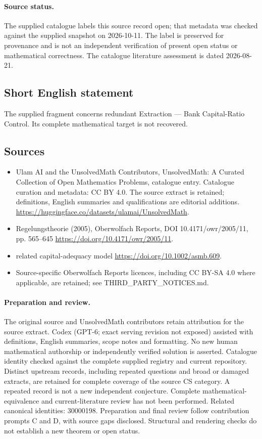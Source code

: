 \documentclass[11pt]{article}
\begin{document}
\paragraph{Source status.}
The supplied catalogue labels this source record open; that metadata was checked against the supplied snapshot on 2026-10-11. The label is preserved for provenance and is not an independent verification of present open status or mathematical correctness. The catalogue literature assessment is dated 2026-08-21.
\subsection{Short English statement}
The supplied fragment concerns redundant Extraction — Bank Capital-Ratio Control. Its complete mathematical target is not recovered.
\subsection{Sources}
\begin{itemize}
\item[\hypertarget{source:statement:1}{S1}] Ulam AI and the UnsolvedMath Contributors, UnsolvedMath: A Curated Collection of Open Mathematics Problems, catalogue entry. Catalogue curation and metadata: CC BY 4.0. The source extract is retained; definitions, English summaries and qualifications are editorial additions.
\url{https://huggingface.co/datasets/ulamai/UnsolvedMath}.
\item[\hypertarget{source:statement:2}{S2}] Regelungstheorie (2005), Oberwolfach Reports, DOI 10.4171/owr/2005/11, pp. 565--645
\url{https://doi.org/10.4171/owr/2005/11}.
\item[\hypertarget{source:statement:3}{S3}] related capital-adequacy model
\url{https://doi.org/10.1002/asmb.609}.
\item Source-specific Oberwolfach Reports licences, including CC BY-SA 4.0 where applicable, are retained; see THIRD\_PARTY\_NOTICES.md.
\end{itemize}
\paragraph{Preparation and review.}
The original source and UnsolvedMath contributors retain attribution for the source extract. Codex (GPT-6; exact serving revision not exposed) assisted with definitions, English summaries, scope notes and formatting. No new human mathematical authorship or independently verified solution is asserted. Catalogue identity checked against the complete supplied registry and current repository. Distinct upstream records, including repeated questions and broad or damaged extracts, are retained for complete coverage of the source CS category. A repeated record is not a new independent conjecture. Complete mathematical-equivalence and current-literature review has not been performed. Related canonical identities: 30000198. Preparation and final review follow contribution prompts C and D, with source gaps disclosed. Structural and rendering checks do not establish a new theorem or open status.
\label{end:statement}
\end{document}

